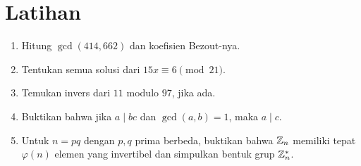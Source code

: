 \documentclass[../main.tex]{subfiles}
\begin{document}
\section{Latihan}
\begin{enumerate}
  \item Hitung \(\gcd(414, 662)\) dan koefisien Bezout-nya.
  \item Tentukan semua solusi dari \(15x\equiv 6 \pmod{21}\).
  \item Temukan invers dari \(11\) modulo \(97\), jika ada.
  \item Buktikan bahwa jika \(a\mid bc\) dan \(\gcd(a,b)=1\), maka \(a\mid c\).
  \item Untuk \(n=pq\) dengan \(p,q\) prima berbeda, buktikan bahwa \(\mathbb{Z}_n\) memiliki tepat \(\varphi(n)\) elemen yang invertibel dan simpulkan bentuk grup \(\mathbb{Z}_n^*\).
\end{enumerate}
\end{document}
